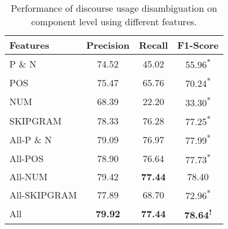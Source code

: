 \begin{table}[!htbp]
\centering
\begin{tabular}{|l|c|c|c|}
\hline

Features        &     Precision &     Recall &     F1-Score                 \\ \hline
P \& N          &     74.52     &     45.02  &     55.96\textsuperscript{*} \\ \hline
POS             &     75.47     &     65.76  &     70.24\textsuperscript{*} \\ \hline
NUM             &     68.39     &     22.20  &     33.30\textsuperscript{*} \\ \hline
SKIPGRAM        &     78.33     &     76.28  &     77.25\textsuperscript{*} \\ \hline
All-P \& N      &     79.09     &     76.97  &     77.99\textsuperscript{*} \\ \hline
All-POS         &     78.90     &     76.64  &     77.73\textsuperscript{*} \\ \hline
All-NUM         &     79.42     & \bf 77.44  &     78.40\textsuperscript{ } \\ \hline
All-SKIPGRAM    &     77.89     &     68.70  &     72.96\textsuperscript{*} \\ \hline
All             & \bf 79.92     & \bf 77.44  & \bf 78.64\textsuperscript{!} \\ \hline


\end{tabular}
\caption{\label{t:recognition-features} Performance of discourse usage
disambiguation on component level using different features. }
\end{table}
